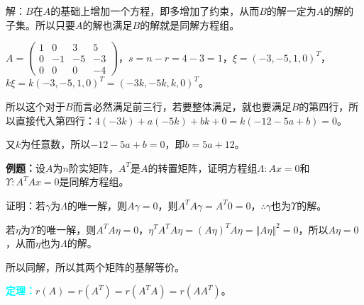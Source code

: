解：$B$在$A$的基础上增加一个方程，即多增加了约束，从而$B$的解一定为$A$的解的子集。所以只要$A$的解也满足$B$的解就是同解方程组。

$A=\left(\begin{array}{cccc}
    1 & 0 & 3 & 5 \\
    0 & -1 & -5 & -3 \\
    0 & 0 & 0 & -4
\end{array}\right)$，$s=n-r=4-3=1$，$\xi=(-3,-5,1,0)^T$，$k\xi=k(-3,-5,1,0)^T=(-3k,-5k,k,0)^T$。

所以这个对于$B$而言必然满足前三行，若要整体满足，就也要满足$B$的第四行，所以直接代入第四行：$4(-3k)+a(-5k)+bk+0=k(-12-5a+b)=0$。

又$k$为任意数，所以$-12-5a+b=0$，即$b=5a+12$。

\textbf{例题：}设$A$为$n$阶实矩阵，$A^T$是$A$的转置矩阵，证明方程组$\Lambda:Ax=0$和$\Upsilon:A^TAx=0$是同解方程组。

证明：若$\gamma$为$\Lambda$的唯一解，则$A\gamma=0$，则$A^TA\gamma=A^T0=0$，$\therefore\gamma$也为$\Upsilon$的解。

若$\eta$为$\Upsilon$的唯一解，则$A^TA\eta=0$，$\eta^TA^TA\eta=(A\eta)^TA\eta=\Vert A\eta\Vert^2=0$，所以$A\eta=0$，从而$\eta$也为$\Lambda$的解。

所以同解，所以其两个矩阵的基解等价。

\textcolor{aqua}{\textbf{定理：}}$r(A)=r(A^T)=r(A^TA)=r(AA^T)$。

%
